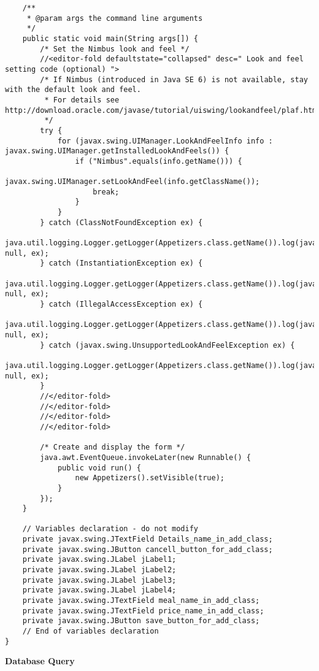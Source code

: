 \documentclass[12pt,a4paper]{article}
\begin{document}
\begin{lstlisting}
    /**
     * @param args the command line arguments
     */
    public static void main(String args[]) {
        /* Set the Nimbus look and feel */
        //<editor-fold defaultstate="collapsed" desc=" Look and feel setting code (optional) ">
        /* If Nimbus (introduced in Java SE 6) is not available, stay with the default look and feel.
         * For details see http://download.oracle.com/javase/tutorial/uiswing/lookandfeel/plaf.html 
         */
        try {
            for (javax.swing.UIManager.LookAndFeelInfo info : javax.swing.UIManager.getInstalledLookAndFeels()) {
                if ("Nimbus".equals(info.getName())) {
                    javax.swing.UIManager.setLookAndFeel(info.getClassName());
                    break;
                }
            }
        } catch (ClassNotFoundException ex) {
            java.util.logging.Logger.getLogger(Appetizers.class.getName()).log(java.util.logging.Level.SEVERE, null, ex);
        } catch (InstantiationException ex) {
            java.util.logging.Logger.getLogger(Appetizers.class.getName()).log(java.util.logging.Level.SEVERE, null, ex);
        } catch (IllegalAccessException ex) {
            java.util.logging.Logger.getLogger(Appetizers.class.getName()).log(java.util.logging.Level.SEVERE, null, ex);
        } catch (javax.swing.UnsupportedLookAndFeelException ex) {
            java.util.logging.Logger.getLogger(Appetizers.class.getName()).log(java.util.logging.Level.SEVERE, null, ex);
        }
        //</editor-fold>
        //</editor-fold>
        //</editor-fold>
        //</editor-fold>

        /* Create and display the form */
        java.awt.EventQueue.invokeLater(new Runnable() {
            public void run() {
                new Appetizers().setVisible(true);
            }
        });
    }

    // Variables declaration - do not modify                     
    private javax.swing.JTextField Details_name_in_add_class;
    private javax.swing.JButton cancell_button_for_add_class;
    private javax.swing.JLabel jLabel1;
    private javax.swing.JLabel jLabel2;
    private javax.swing.JLabel jLabel3;
    private javax.swing.JLabel jLabel4;
    private javax.swing.JTextField meal_name_in_add_class;
    private javax.swing.JTextField price_name_in_add_class;
    private javax.swing.JButton save_button_for_add_class;
    // End of variables declaration                   
}

	\end{lstlisting}
	\bfseries Database Query
\end{document}
